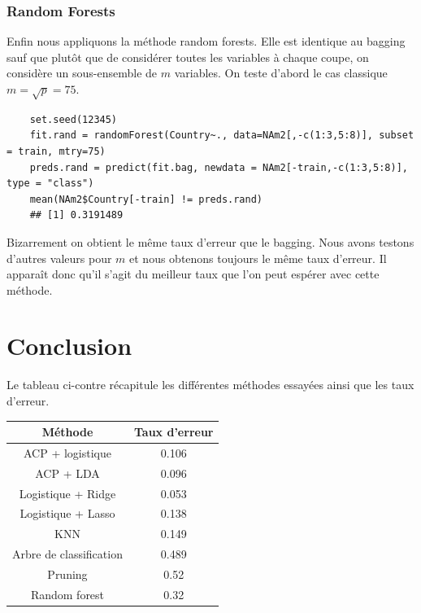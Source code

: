 \documentclass[12pt,a4paper]{article}
\begin{document}
\subsubsection{Random Forests}
Enfin nous appliquons la méthode random forests. Elle est identique au bagging sauf que plutôt que de considérer toutes les variables à chaque coupe, on considère un sous-ensemble de $m$ variables. On teste d'abord le cas classique $m=\sqrt{p} = 75$.
\begin{lstlisting}
	set.seed(12345)
	fit.rand = randomForest(Country~., data=NAm2[,-c(1:3,5:8)], subset = train, mtry=75)
	preds.rand = predict(fit.bag, newdata = NAm2[-train,-c(1:3,5:8)], type = "class")
	mean(NAm2$Country[-train] != preds.rand)
	## [1] 0.3191489
\end{lstlisting}
Bizarrement on obtient le même taux d'erreur que le bagging. Nous avons testons d'autres valeurs pour $m$ et nous obtenons toujours le même taux d'erreur. Il apparaît donc qu'il s'agit du meilleur taux que l'on peut espérer avec cette méthode.
\section{Conclusion}
Le tableau ci-contre récapitule les différentes méthodes essayées ainsi que les taux d'erreur.
\begin{center}
	\begin{tabular}{|c|c|}
		\hline
		Méthode & Taux d'erreur \\ \hline
		ACP + logistique & 0.106 \\ \hline
		ACP + LDA & 0.096 \\ \hline
		Logistique + Ridge & 0.053 \\ \hline
		Logistique + Lasso & 0.138 \\ \hline
		KNN & 0.149 \\ \hline
		Arbre de classification & 0.489 \\ \hline
		Pruning & 0.52 \\ \hline
		Random forest & 0.32 \\ \hline
	\end{tabular}
	\label{tab:resume}
\end{center}
\end{document}
